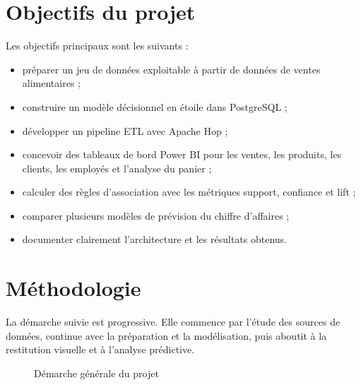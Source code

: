 \documentclass[12pt,a4paper,twoside]{report}
\begin{document}
\section{Objectifs du projet}

Les objectifs principaux sont les suivants :

\begin{itemize}
  \item préparer un jeu de données exploitable à partir de données de ventes alimentaires ;
  \item construire un modèle décisionnel en étoile dans PostgreSQL ;
  \item développer un pipeline ETL avec Apache Hop ;
  \item concevoir des tableaux de bord Power BI pour les ventes, les produits, les clients, les employés et l'analyse du panier ;
  \item calculer des règles d'association avec les métriques support, confiance et lift ;
  \item comparer plusieurs modèles de prévision du chiffre d'affaires ;
  \item documenter clairement l'architecture et les résultats obtenus.
\end{itemize}

\section{Méthodologie}

La démarche suivie est progressive. Elle commence par l'étude des sources de données, continue avec la préparation et la modélisation, puis aboutit à la restitution visuelle et à l'analyse prédictive.

\begin{figure}[H]
\centering
{}
\caption{Démarche générale du projet}
\end{figure}
\end{document}
